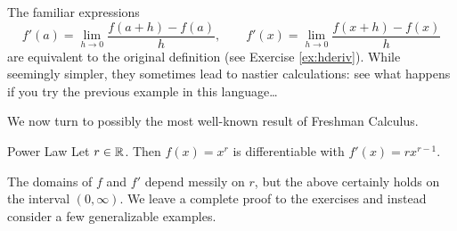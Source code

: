 The familiar expressions
\[f'(a)=\lim_{h\to 0}\frac{f(a+h)-f(a)}h,\qquad f'(x)=\lim_{h\to 0}\frac{f(x+h)-f(x)}h\]
are equivalent to the original definition (see Exercise \ref{ex:hderiv}). While seemingly simpler, they sometimes lead to nastier calculations: see what happens if you try the previous example in this language\ldots\medbreak\goodbreak

We now turn to possibly the most well-known result of Freshman Calculus.

\begin{thm}{Power Law}{}
Let $r\in\mathbb{R}$. Then $f(x)=x^r$ is differentiable with $f'(x)=rx^{r-1}$.
\end{thm}

The domains of $f$ and $f'$ depend messily on $r$, but the above certainly holds on the interval $(0,\infty)$. We leave a complete proof to the exercises and instead consider a few generalizable examples.

